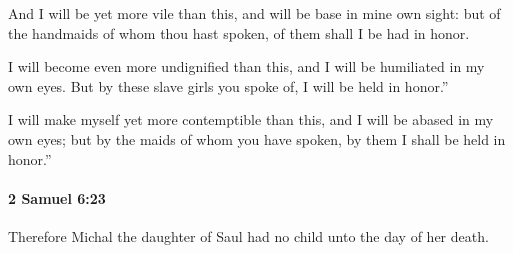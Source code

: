 			\begin{versebox}
					\item[BHS] 
					\item[ASV] And I will be yet more vile than this, and will be base in mine own sight: but of the handmaids of whom thou hast spoken, of them shall I be had in honor.
					\item[NIV] I will become even more undignified than this, and I will be humiliated in my own eyes. But by these slave girls you spoke of, I will be held in honor.”
					\item[NRSV] I will make myself yet more contemptible than this, and I will be abased in my own eyes; but by the maids of whom you have spoken, by them I shall be held in honor.”
			\end{versebox}

		\paragraph{2 Samuel 6:23} %
			\label{2SAMUEL-6-23}

			Therefore Michal the daughter of Saul had no child unto the day of her death.

